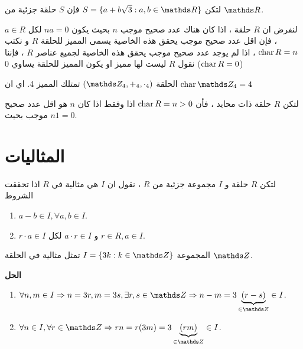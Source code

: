  \begin{example}
 	لتكن $S = \{a+b\sqrt{3} : a, b\in \R \}$ فإن $S$ حلقة جزئية من $\R$.
 \end{example}
 
 \begin{definition}
 	لنفرض ان $R$ حلقة ، اذا كان هناك عدد صحيح موجب $n$ بحيث يكون $na=0$ لكل $a\in R$ ، فإن اقل عدد صحيح موجب يحقق هذه الخاصية يسمى المميز للحلقة $R$ و نكتب $\operatorname{char} R = n$ ، اذا لم يوجد عدد صحيح موجب يحقق هذه الخاصية لجميع عناصر $R$ ، فإننا نقول $R$ ليست لها مميز او يكون المميز للحلقة يساوي 0 ($\operatorname{char} R=0$)
 \end{definition}
 
 \begin{example}
 	الحلقة 
 	$(\Z_4, +_4, \cdot_4) $ تمتلك المميز 4. اي ان $\Char \Z_4=4$
 \end{example}
 
 \begin{theorem}
 	لتكن $R$ حلقة ذات محايد ، فأن $\operatorname{char} R=n >0$ اذا وفقط اذا كان $n$ هو اقل عدد صحيح موجب بحيث $n1=0$.
 \end{theorem}
 \newpage
 
 \section{المثاليات}
 \begin{definition}
 	لتكن $R$ حلقة و $I$ مجموعة جزئية من $R$ ، نقول ان $I$ هي مثالية في $R$ اذا تحققت الشروط
 	\begin{enumerate}[label=$\boxed{\arabic*}$]
 		\item $a-b\in I, \forall a, b\in I$.
 		\item $r\cdot a \in I$ و $a\cdot r\in I$ لكل $r\in R, a\in I$.
 	\end{enumerate}
 \end{definition}
 
 \begin{example}
 	المجموعة 
 	$I = \{3k : k\in \Z\}$ تمثل مثالية في الحلقة $\Z$.
 \end{example}
 \noindent
 \textbf{الحل}
 
 \setLR
 \begin{enumerate}[leftmargin=*, label=$\boxed{\arabic*}$]
 	\item $\forall n,m\in I \Rightarrow n=3r, m=3s, \exists r,s\in \Z \Rightarrow n-m =3\underbrace{(r-s)}_{\in \Z} \in I$.
 	\item $\forall n\in I, \forall r\in \Z \Rightarrow rn = r(3m) = 3\underbrace{(rm)}_{\in \Z} \in I$. 
 \end{enumerate}
 
